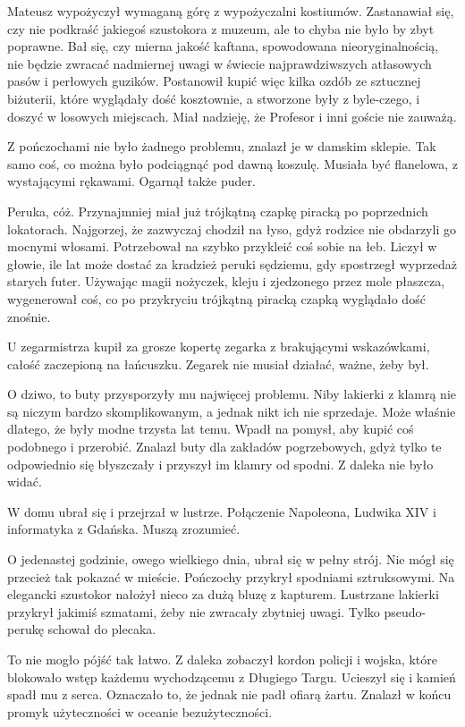 Mateusz wypożyczył wymaganą górę z wypożyczalni kostiumów.
Zastanawiał się, czy nie podkraść jakiegoś szustokora z muzeum, ale to chyba nie było by zbyt poprawne.
Bał się, czy mierna jakość kaftana, spowodowana nieoryginalnością, nie będzie zwracać nadmiernej uwagi w świecie najprawdziwszych atłasowych pasów i perłowych guzików.
Postanowił kupić więc kilka ozdób ze sztucznej biżuterii, które wyglądały dość kosztownie, a stworzone były z 
byle-czego, i doszyć w losowych miejscach. Miał nadzieję, że Profesor i inni goście nie zauważą.

Z pończochami nie było żadnego problemu, znalazł je w damskim sklepie.
Tak samo coś, co można było podciągnąć pod dawną koszulę.
Musiała być flanelowa, z wystającymi rękawami.
Ogarnął także puder.

Peruka, cóż. Przynajmniej miał już trójkątną czapkę piracką po poprzednich lokatorach.
Najgorzej, że zazwyczaj chodził na łyso, gdyż rodzice nie obdarzyli go mocnymi włosami.
Potrzebował na szybko przykleić coś sobie na łeb.
Liczył w głowie, ile lat może dostać za kradzież peruki sędziemu, gdy spostrzegł wyprzedaż starych futer.
Używając magii nożyczek, kleju i zjedzonego przez mole płaszcza, wygenerował coś, co po przykryciu trójkątną piracką czapką wyglądało dość znośnie.

U zegarmistrza kupił za grosze kopertę zegarka z brakującymi wskazówkami, całość zaczepioną na łańcuszku.
Zegarek nie musiał działać, ważne, żeby był.

O dziwo, to buty przysporzyły mu najwięcej problemu.
Niby lakierki z klamrą nie są niczym bardzo skomplikowanym, a jednak nikt ich nie sprzedaje.
Może właśnie dlatego, że były modne trzysta lat temu.
Wpadł na pomysł, aby kupić coś podobnego i przerobić. 
Znalazł buty dla zakładów pogrzebowych, gdyż tylko te odpowiednio się błyszczały i przyszył im klamry od spodni.
Z daleka nie było widać.

W domu ubrał się i przejrzał w lustrze.
Połączenie Napoleona, Ludwika XIV i informatyka z Gdańska.
Muszą zrozumieć.

O jedenastej godzinie, owego wielkiego dnia, ubrał się w pełny strój.
Nie mógł się przecież tak pokazać w mieście.
Pończochy przykrył spodniami sztruksowymi.
Na elegancki szustokor nałożył nieco za dużą bluzę z kapturem.
Lustrzane lakierki przykrył jakimiś szmatami, żeby nie zwracały zbytniej uwagi.
Tylko pseudo-perukę schował do plecaka.

To nie mogło pójść tak łatwo.
Z daleka zobaczył kordon policji i wojska, które blokowało wstęp każdemu wychodzącemu z Długiego Targu.
Ucieszył się i kamień spadł mu z serca. Oznaczało to, że jednak nie padł ofiarą żartu.
Znalazł w końcu promyk użyteczności w oceanie bezużyteczności.

